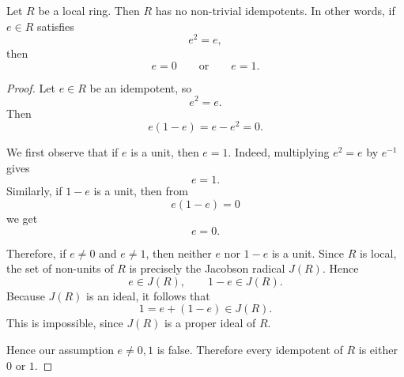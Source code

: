 \begin{theorem}
    Let $R$ be a local ring. Then $R$ has no non-trivial idempotents. In other words,
    if $e\in R$ satisfies
    \[
        e^2=e,
    \]
    then
    \[
        e=0
        \qquad\text{or}\qquad
        e=1.
    \]
\end{theorem}

\begin{proof}
    Let $e\in R$ be an idempotent, so
    \[
        e^2=e.
    \]
    Then
    \[
        e(1-e)=e-e^2=0.
    \]

    We first observe that if $e$ is a unit, then $e=1$. Indeed, multiplying
    $e^2=e$ by $e^{-1}$ gives
    \[
        e=1.
    \]
    Similarly, if $1-e$ is a unit, then from
    \[
        e(1-e)=0
    \]
    we get
    \[
        e=0.
    \]

    Therefore, if $e\neq 0$ and $e\neq 1$, then neither $e$ nor $1-e$ is a unit.
    Since $R$ is local, the set of non-units of $R$ is precisely the Jacobson radical
    $J(R)$. Hence
    \[
        e\in J(R),
        \qquad
        1-e\in J(R).
    \]
    Because $J(R)$ is an ideal, it follows that
    \[
        1=e+(1-e)\in J(R).
    \]
    This is impossible, since $J(R)$ is a proper ideal of $R$.

    Hence our assumption $e\neq 0,1$ is false. Therefore every idempotent of $R$
    is either $0$ or $1$.
\end{proof}
